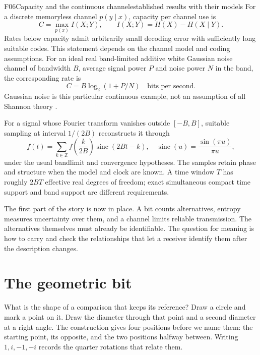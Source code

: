\documentclass[11pt,a4paper]{article}
\newcommand{\Z}{\mathbb{Z}}
\begin{document}
\begin{formal}{F06}{Capacity and the continuous channel}{established results with their models}
For a discrete memoryless channel $p(y\mid x)$, capacity per channel use is
\begin{equation}
 C=\max_{p(x)} I(X;Y),\qquad I(X;Y)=H(X)-H(X\mid Y).
\end{equation}
Rates below capacity admit arbitrarily small decoding error with sufficiently
long suitable codes. This statement depends on the channel model and coding
assumptions. For an ideal real band-limited additive white Gaussian noise
channel of bandwidth $B$, average signal power $P$ and noise power $N$ in the
band, the corresponding rate is
\begin{equation}
 C=B\log_2(1+P/N)\quad\text{bits per second}.
\end{equation}
Gaussian noise is this particular continuous example, not an assumption of
all Shannon theory \citep{Shannon1948,Shannon1949}.

For a signal whose Fourier transform vanishes outside $[-B,B]$, suitable
sampling at interval $1/(2B)$ reconstructs it through
\begin{equation}\label{eq:sampling}
 f(t)=\sum_{k\in\Z} f\left(\frac{k}{2B}\right)
 \operatorname{sinc}(2Bt-k),\quad
 \operatorname{sinc}(u)=\frac{\sin(\pi u)}{\pi u},
\end{equation}
under the usual bandlimit and convergence hypotheses. The samples retain
phase and structure when the model and clock are known. A time window $T$ has
roughly $2BT$ effective real degrees of freedom; exact simultaneous compact
time support and band support are different requirements.
\end{formal}

The first part of the story is now in place. A bit counts alternatives,
entropy measures uncertainty over them, and a channel limits reliable
transmission. The alternatives themselves must already be identifiable. The
question for meaning is how to carry and check the relationships that let a
receiver identify them after the description changes.

\section{The geometric bit}
\label{sec:geometric}

What is the shape of a comparison that keeps its reference? Draw a circle and
mark a point on it. Draw the diameter through that point and a second diameter
at a right angle. The construction gives four positions before we name them:
the starting point, its opposite, and the two positions halfway between.
Writing $1,i,-1,-i$ records the quarter rotations that relate them.
\end{document}
